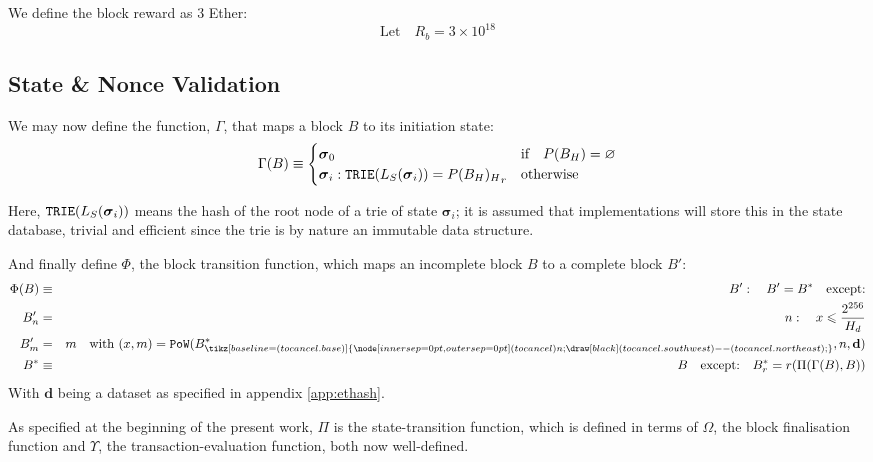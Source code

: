 \documentclass[9pt,oneside]{amsart}
\newcommand{\hcancel}[1]{%
    \tikz[baseline=(tocancel.base)]{
        \node[inner sep=0pt,outer sep=0pt] (tocancel) {#1};
        \draw[black] (tocancel.south west) -- (tocancel.north east);
    }%
}%
\begin{document}
\begin{multicols}{2}
We define the block reward as 3 Ether:
\begin{equation}
\text{Let} \quad R_b = 3 \times 10^{18}
\end{equation}

\subsection{State \& Nonce Validation}\label{sec:statenoncevalidation}

We may now define the function, $\Gamma$, that maps a block $B$ to its initiation state:
\begin{equation}
\Gamma(B) \equiv \begin{cases}
\boldsymbol{\sigma}_0 & \text{if} \quad P(B_H) = \varnothing \\
\boldsymbol{\sigma}_i: \mathtt{\small TRIE}(L_S(\boldsymbol{\sigma}_i)) = {P(B_H)_H}_r & \text{otherwise}
\end{cases}
\end{equation}

Here, $\mathtt{\small TRIE}(L_S(\boldsymbol{\sigma}_i))$ means the hash of the root node of a trie of state $\boldsymbol{\sigma}_i$; it is assumed that implementations will store this in the state database, trivial and efficient since the trie is by nature an immutable data structure.

And finally define $\Phi$, the block transition function, which maps an incomplete block $B$ to a complete block $B'$:
\begin{eqnarray}
\Phi(B) & \equiv & B': \quad B' = B^* \quad \text{except:} \\
B'_n & = & n: \quad x \leqslant \frac{2^{256}}{H_d} \\
B'_m & = & m \quad \text{with } (x, m) = \mathtt{PoW}(B^*_{\hcancel{n}}, n, \mathbf{d}) \\
B^* & \equiv & B \quad \text{except:} \quad B^*_r = r(\Pi(\Gamma(B), B))
\end{eqnarray}
With $\mathbf{d}$ being a dataset as specified in appendix \ref{app:ethash}.

As specified at the beginning of the present work, $\Pi$ is the state-transition function, which is defined in terms of $\Omega$, the block finalisation function and $\Upsilon$, the transaction-evaluation function, both now well-defined.


\end{multicols}
\end{document}
